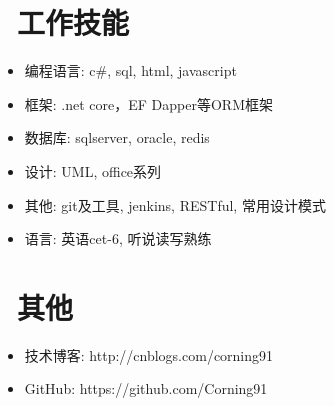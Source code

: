 \documentclass{resume}
\begin{document}
\section{\faCogs\ 工作技能}
\begin{itemize}[parsep=0.5ex]
  \item 编程语言: c\#, sql, html, javascript
  \item 框架: .net core，EF Dapper等ORM框架
  \item 数据库: sqlserver, oracle, redis
  \item 设计: UML, office系列
  \item 其他: git及工具, jenkins, RESTful, 常用设计模式
  \item 语言: 英语cet-6, 听说读写熟练
\end{itemize}

\section{\faInfo\ 其他}
\begin{itemize}[parsep=0.5ex]
  \item 技术博客: http://cnblogs.com/corning91
  \item GitHub: https://github.com/Corning91
\end{itemize}

%
%
\end{document}
